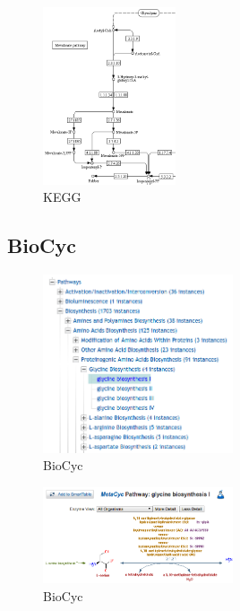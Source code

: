 \documentclass[conference]{IEEEtran}
\begin{document}
\begin{figure}[!t]
\centering
\includegraphics[width=0.35\textwidth]{terpenoid_meva_kegg_solo.png}
\caption{KEGG}
\label{terpenoid_meva_kegg_solo}
\end{figure}

\subsection{BioCyc}

\begin{figure}[!t]
\centering
\includegraphics[width=0.5\textwidth]{metacyc_arvore.png}
\caption{BioCyc}
\label{metacyc_arvore}
\end{figure}


\begin{figure}[!t]
\centering
\includegraphics[width=0.5\textwidth]{metacyc_glycin_small.png}
\caption{BioCyc}
\label{metacyc_glycin_small}
\end{figure}
\end{document}
